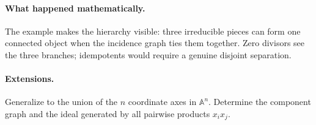 \paragraph{What happened mathematically.}
The example makes the hierarchy visible: three irreducible pieces can form one connected
object when the incidence graph ties them together.  Zero divisors see the three branches;
idempotents would require a genuine disjoint separation.
\paragraph{Extensions.}
Generalize to the union of the \(n\) coordinate axes in \(\mathbb A^n\).  Determine the
component graph and the ideal generated by all pairwise products \(x_ix_j\).
\fi
